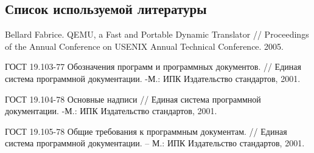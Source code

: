 \subsection{Список используемой литературы}
\begin{my_enumerate}

\item
Bellard Fabrice. QEMU, a Fast and Portable Dynamic Translator //
Proceedings of the Annual Conference on USENIX Annual Technical Conference. 2005.

\item
ГОСТ 19.103-77 Обозначения программ и программных документов. // Единая система программной документации. -М.: ИПК Издательство стандартов, 2001. \\

\item
ГОСТ 19.104-78 Основные надписи // Единая система программной документации. -М.: ИПК Издательство стандартов, 2001. \\

\item
ГОСТ 19.105-78 Общие требования к программным документам. // Единая система
программной документации. – М.: ИПК Издательство стандартов, 2001. \\


\end{my_enumerate}

